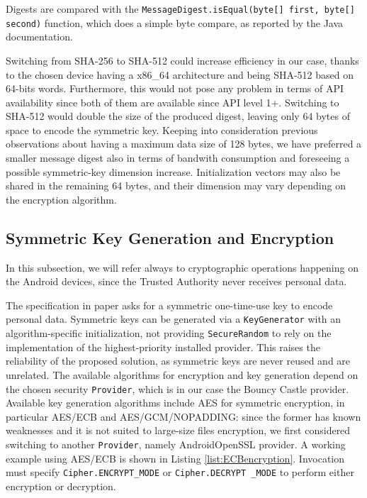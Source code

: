 

Digests are compared with the \texttt{MessageDigest.isEqual(byte[] first, byte[] second)} function, which does a simple byte compare, as reported by the Java documentation.

Switching from SHA-256 to SHA-512 could increase efficiency in our case, thanks to the chosen device having a x86\_64 architecture and being SHA-512 based on 64-bits words.  Furthermore, this would not pose any problem in terms of API availability since both of them are available since API level 1+. Switching to SHA-512 would double the size of the produced digest, leaving only 64 bytes of space to encode the symmetric key. Keeping into consideration previous observations about having a maximum data size of 128 bytes, we have preferred a smaller message digest also in terms of bandwith consumption and foreseeing a possible symmetric-key dimension increase. Initialization vectors may also be shared in the remaining 64 bytes, and their dimension may vary depending on the encryption algorithm.

\subsection{Symmetric Key Generation and Encryption}
In this subsection, we will refer always to cryptographic operations happening on the Android devices, since the Trusted Authority never receives personal data.

The specification in paper \cite{pearson2011sticky} asks for a symmetric one-time-use key to encode personal data. Symmetric keys can be generated via a \texttt{KeyGenerator} with an algorithm-specific initialization, not providing \texttt{SecureRandom} to rely on the implementation of the highest-priority installed provider. This raises the reliability of the proposed solution, as symmetric keys are never reused and are unrelated. The available algorithms for encryption and key generation depend on the chosen security \texttt{Provider}, which is in our case the Bouncy Castle provider. Available key generation algorithms include AES for symmetric encryption, in particular AES/ECB and AES/GCM/NOPADDING: since the former has known weaknesses and it is not suited to large-size files encryption, we first considered switching to another \texttt{Provider}, namely AndroidOpenSSL provider. A working example using AES/ECB is shown in Listing \ref{list:ECBencryption}. Invocation must specify \texttt{Cipher.ENCRYPT\_MODE} or \texttt{Cipher.DECRYPT \_MODE} to perform either encryption or decryption.

